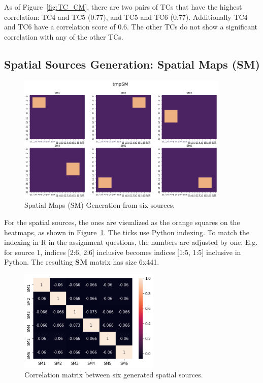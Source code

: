 \documentclass[11pt]{article}
\begin{document}
  As of Figure~\ref{fig:TC_CM}, there are two pairs of TCs that have the highest correlation: TC4 and TC5 (0.77), and TC5 and TC6 (0.77). Additionally TC4 and TC6 have a correlation score of 0.6. The other TCs do not show a significant correlation with any of the other TCs.


\subsection{Spatial Sources Generation: Spatial Maps (SM)}

\begin{figure}[H]
    \begin{center}
       \includegraphics[width=0.9\textwidth]{../plots/1_3_a_SMs}
      \caption{Spatial Maps (SM) Generation from six sources.}
      \label{fig:sm_generation}
    \end{center}
  \end{figure}

For the spatial sources, the ones are visualized as the orange squares on the heatmaps, as shown in Figure~\ref{fig:sm_generation}. The ticks use Python indexing. To match the indexing in R in the assignment questions, the numbers are adjusted by one. E.g. for source 1, indices [2:6, 2:6] inclusive becomes indices [1:5, 1:5] inclusive in Python. The resulting $\mathbf{SM}$ matrix has size 6x441.

  \begin{figure}[H]
    \begin{center}
       \includegraphics[width=0.6\textwidth]{../plots/1_3_b_SM_corr}
      \caption{Correlation matrix between six generated spatial sources.}
      \label{fig:sm_corr}
    \end{center}
  \end{figure}
\end{document}
